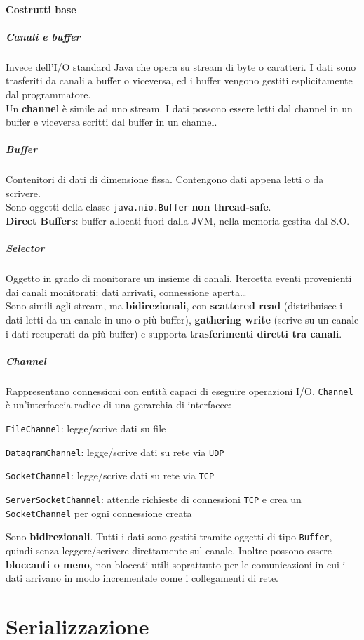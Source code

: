 \documentclass[10pt]{article}
\begin{document}
\paragraph{Costrutti base}
\subparagraph{Canali e buffer} Invece dell'I/O standard Java che opera su stream di byte o caratteri. I dati sono trasferiti da canali a buffer o viceversa, ed i buffer vengono gestiti esplicitamente dal programmatore.\\
Un \textbf{channel} è simile ad uno stream. I dati possono essere letti dal channel in un buffer e viceversa scritti dal buffer in un channel.
\subparagraph{Buffer} Contenitori di dati di dimensione fissa. Contengono dati appena letti o da scrivere.\\
Sono oggetti della classe \texttt{java.nio.Buffer} \textbf{non thread-safe}.\\
\textbf{Direct Buffers}: buffer allocati fuori dalla JVM, nella memoria gestita dal S.O.
\subparagraph{Selector} Oggetto in grado di monitorare un insieme di canali. Itercetta eventi provenienti dai canali monitorati: dati arrivati, connessione aperta\ldots\\
Sono simili agli stream, ma \textbf{bidirezionali}, con \textbf{scattered read} (distribuisce i dati letti da un canale in uno o più buffer), \textbf{gathering write} (scrive su un canale i dati recuperati da più buffer) e supporta \textbf{trasferimenti diretti tra canali}.
\subparagraph{Channel} Rappresentano connessioni con entità capaci di eseguire operazioni I/O. \texttt{Channel} è un'interfaccia radice di una gerarchia di interfacce:
\begin{list}{}{}
	\item \texttt{FileChannel}: legge/scrive dati su file
	\item \texttt{DatagramChannel}: legge/scrive dati su rete via \texttt{UDP}
	\item \texttt{SocketChannel}: legge/scrive dati su rete via \texttt{TCP}
	\item \texttt{ServerSocketChannel}: attende richieste di connessioni \texttt{TCP} e crea un \texttt{SocketChannel} per ogni connessione creata
\end{list}
Sono \textbf{bidirezionali}. Tutti i dati sono gestiti tramite oggetti di tipo \texttt{Buffer}, quindi senza leggere/scrivere direttamente sul canale. Inoltre possono essere \textbf{bloccanti o meno}, non bloccati utili soprattutto per le comunicazioni in cui i dati arrivano in modo incrementale come i collegamenti di rete.
\section{Serializzazione}
\end{document}
